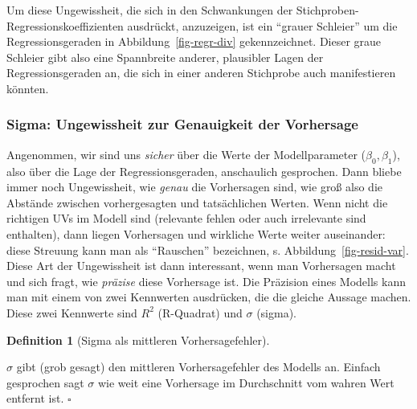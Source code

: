 \documentclass[
  ngerman,
  letterpaper,
  twoside,
  open=any]{scrbook}
\theoremstyle{definition}
\theoremstyle{plain}
\theoremstyle{definition}
\theoremstyle{definition}
\newtheorem{definition}{Definition}[chapter]
\theoremstyle{definition}
\theoremstyle{definition}
\theoremstyle{remark}
\begin{document}
Um diese Ungewissheit, die sich in den Schwankungen der
Stichproben-Regressionskoeffizienten ausdrückt, anzuzeigen, ist ein
\enquote{grauer Schleier} um die Regressionsgeraden in
Abbildung~\ref{fig-regr-div} gekennzeichnet. Dieser graue Schleier gibt
also eine Spannbreite anderer, plausibler Lagen der Regressionsgeraden
an, die sich in einer anderen Stichprobe auch manifestieren könnten.

\subsubsection{Sigma: Ungewissheit zur Genauigkeit der
Vorhersage}\label{sigma-ungewissheit-zur-genauigkeit-der-vorhersage}

Angenommen, wir sind uns \emph{sicher} über die Werte der
Modellparameter (\(\beta_0, \beta_1\)), also über die Lage der
Regressionsgeraden, anschaulich gesprochen. Dann bliebe immer noch
Ungewissheit, wie \emph{genau} die Vorhersagen sind, wie groß also die
Abstände zwischen vorhergesagten und tatsächlichen Werten. Wenn nicht
die richtigen UVs im Modell sind (relevante fehlen oder auch irrelevante
sind enthalten), dann liegen Vorhersagen und wirkliche Werte weiter
auseinander: diese Streuung kann man als \enquote{Rauschen} bezeichnen,
s. Abbildung~\ref{fig-resid-var}. Diese Art der Ungewissheit ist dann
interessant, wenn man Vorhersagen macht und sich fragt, wie
\emph{präzise} diese Vorhersage ist. Die Präzision eines Modells kann
man mit einem von zwei Kennwerten ausdrücken, die die gleiche Aussage
machen. Diese zwei Kennwerte sind \(R^2\) (R-Quadrat) und \(\sigma\)
(sigma).

\begin{definition}[Sigma als mittleren
Vorhersagefehler]\protect\hypertarget{def-sigma}{}\label{def-sigma}

\(\sigma\) gibt (grob gesagt) den mittleren Vorhersagefehler des Modells
an. Einfach gesprochen sagt \(\sigma\) wie weit eine Vorhersage im
Durchschnitt vom wahren Wert entfernt ist. \(\square\)

\end{definition}
\end{document}
